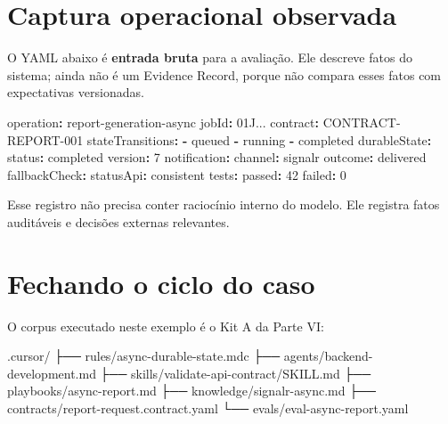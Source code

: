 \documentclass[
  10pt,
  a4paper,
  oneside]{book}
\newenvironment{Shaded}{}{}
\newcommand{\AttributeTok}[1]{\textcolor[rgb]{0.49,0.56,0.16}{#1}}
\newcommand{\DecValTok}[1]{\textcolor[rgb]{0.25,0.63,0.44}{#1}}
\newcommand{\FunctionTok}[1]{\textcolor[rgb]{0.02,0.16,0.49}{#1}}
\newcommand{\KeywordTok}[1]{\textcolor[rgb]{0.00,0.44,0.13}{\textbf{#1}}}
\newcommand{\NormalTok}[1]{#1}
\begin{document}
\hypertarget{captura-operacional-observada}{%
\section{Captura operacional
observada}\label{captura-operacional-observada}}

O YAML abaixo é \textbf{entrada bruta} para a avaliação. Ele descreve
fatos do sistema; ainda não é um Evidence Record, porque não compara
esses fatos com expectativas versionadas.

\begin{Shaded}
\begin{Highlighting}[]
\FunctionTok{operation}\KeywordTok{:}\AttributeTok{ report{-}generation{-}async}
\FunctionTok{jobId}\KeywordTok{:}\AttributeTok{ 01J...}
\FunctionTok{contract}\KeywordTok{:}\AttributeTok{ CONTRACT{-}REPORT{-}001}
\FunctionTok{stateTransitions}\KeywordTok{:}
\AttributeTok{  }\KeywordTok{{-}}\AttributeTok{ queued}
\AttributeTok{  }\KeywordTok{{-}}\AttributeTok{ running}
\AttributeTok{  }\KeywordTok{{-}}\AttributeTok{ completed}
\FunctionTok{durableState}\KeywordTok{:}
\AttributeTok{  }\FunctionTok{status}\KeywordTok{:}\AttributeTok{ completed}
\AttributeTok{  }\FunctionTok{version}\KeywordTok{:}\AttributeTok{ }\DecValTok{7}
\FunctionTok{notification}\KeywordTok{:}
\AttributeTok{  }\FunctionTok{channel}\KeywordTok{:}\AttributeTok{ signalr}
\AttributeTok{  }\FunctionTok{outcome}\KeywordTok{:}\AttributeTok{ delivered}
\FunctionTok{fallbackCheck}\KeywordTok{:}
\AttributeTok{  }\FunctionTok{statusApi}\KeywordTok{:}\AttributeTok{ consistent}
\FunctionTok{tests}\KeywordTok{:}
\AttributeTok{  }\FunctionTok{passed}\KeywordTok{:}\AttributeTok{ }\DecValTok{42}
\AttributeTok{  }\FunctionTok{failed}\KeywordTok{:}\AttributeTok{ }\DecValTok{0}
\end{Highlighting}
\end{Shaded}

Esse registro não precisa conter raciocínio interno do modelo. Ele
registra fatos auditáveis e decisões externas relevantes.

\hypertarget{fechando-o-ciclo-do-caso}{%
\section{Fechando o ciclo do caso}\label{fechando-o-ciclo-do-caso}}

O corpus executado neste exemplo é o Kit A da Parte VI:

\begin{Shaded}
\begin{Highlighting}[]
\NormalTok{.cursor/}
\NormalTok{├── rules/async{-}durable{-}state.mdc}
\NormalTok{├── agents/backend{-}development.md}
\NormalTok{├── skills/validate{-}api{-}contract/SKILL.md}
\NormalTok{├── playbooks/async{-}report.md}
\NormalTok{├── knowledge/signalr{-}async.md}
\NormalTok{├── contracts/report{-}request.contract.yaml}
\NormalTok{└── evals/eval{-}async{-}report.yaml}
\end{Highlighting}
\end{Shaded}
\end{document}
